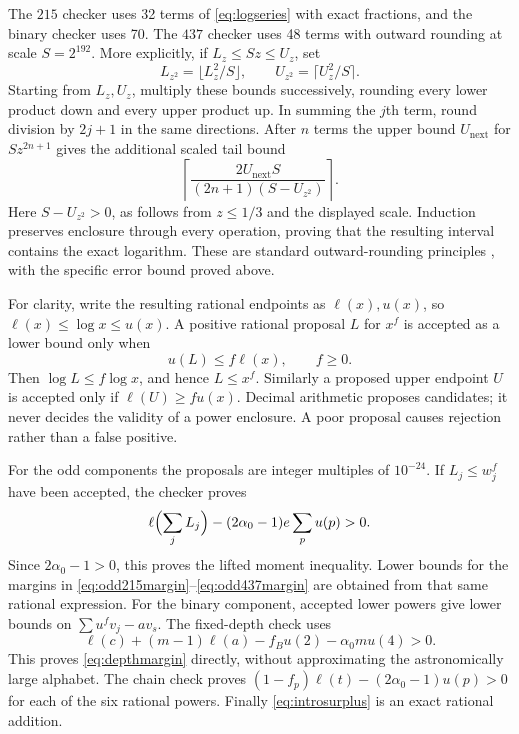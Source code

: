 \documentclass[11pt]{article}
\theoremstyle{definition}
\theoremstyle{remark}
\newcommand{\al}{\alpha_0}
\begin{document}
The $215$ checker uses 32 terms of \eqref{eq:logseries} with exact
fractions, and the binary checker uses 70. The $437$ checker uses 48
terms with outward rounding at scale $S=2^{192}$. More explicitly, if
$L_z\le Sz\le U_z$, set
\[
 L_{z^2}=\lfloor L_z^2/S\rfloor,\qquad
 U_{z^2}=\lceil U_z^2/S\rceil.
\]
Starting from $L_z,U_z$, multiply these bounds successively, rounding every
lower product down and every upper product up. In summing the $j$th term,
round division by $2j+1$ in the same directions. After $n$ terms the
upper bound $U_{\mathrm{next}}$ for $S z^{2n+1}$ gives the additional
scaled tail bound
\[
 \left\lceil
 \frac{2U_{\mathrm{next}}S}{(2n+1)(S-U_{z^2})}
 \right\rceil.
\]
Here $S-U_{z^2}>0$, as follows from $z\le1/3$ and the displayed scale.
Induction preserves enclosure through every operation, proving that the
resulting interval contains the exact logarithm. These are standard
outward-rounding principles \cite{MooreKearfottCloud2009}, with the
specific error bound proved above.

For clarity, write the resulting rational endpoints as $\ell(x),u(x)$,
so $\ell(x)\le\log x\le u(x)$. A positive rational proposal $L$ for
$x^f$ is accepted as a lower bound only when
\begin{equation}\label{eq:poweraccept}
 u(L)\le f\ell(x),\qquad f\ge0.
\end{equation}
Then $\log L\le f\log x$, and hence $L\le x^f$. Similarly a proposed
upper endpoint $U$ is accepted only if $\ell(U)\ge fu(x)$.
Decimal arithmetic proposes candidates; it never decides the validity of
a power enclosure. A poor proposal causes rejection rather than a false
positive.

For the odd components the proposals are integer multiples of $10^{-24}$.
If $L_j\le w_j^f$ have been accepted, the checker proves
\[
 \ell\Bigl(\sum_jL_j\Bigr)
 -(2\al-1)e\sum_p u(p)>0.
\]
Since $2\al-1>0$, this proves the lifted moment inequality. Lower
bounds for the margins in \eqref{eq:odd215margin}--\eqref{eq:odd437margin}
are obtained from that same rational expression.
For the binary component, accepted lower powers give lower bounds on
$\sum u^fv_j-av_s$. The fixed-depth check uses
\[
 \ell(c)+(m-1)\ell(a)-f_Bu(2)-\al m u(4)>0.
\]
This proves \eqref{eq:depthmargin} directly, without approximating the
astronomically large alphabet. The chain check proves
$(1-f_p)\ell(t)-(2\al-1)u(p)>0$ for each of the six rational powers.
Finally \eqref{eq:introsurplus} is an exact rational addition.
\end{document}
